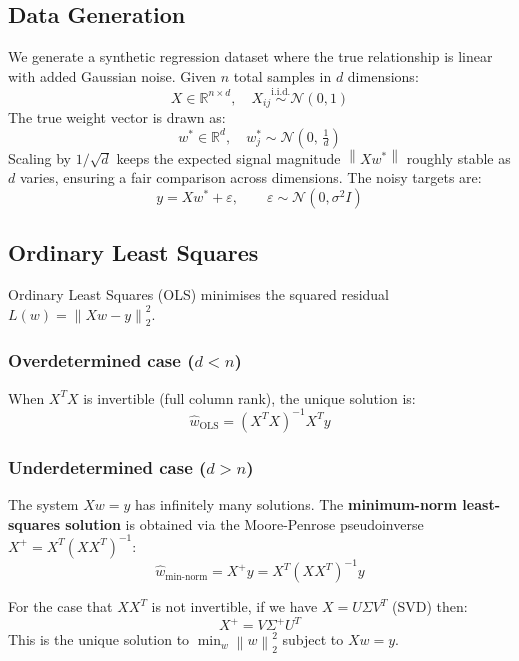 \documentclass[12pt, a4paper]{article}
\newcommand{\R}{\mathbb{R}}
\newcommand{\norm}[1]{\left\lVert #1 \right\rVert}
\begin{document}
\subsection{Data Generation}

We generate a synthetic regression dataset where the true relationship is linear with added Gaussian noise. Given $n$ total samples in $d$ dimensions:
\[
  X \in \R^{n \times d},\quad X_{ij} \overset{\text{i.i.d.}}{\sim} \mathcal{N}(0,1)
\]
The true weight vector is drawn as:
\[
  w^* \in \R^d,\quad w^*_j \sim \mathcal{N}\!\left(0,\,\tfrac{1}{d}\right)
\]
Scaling by $1/\sqrt{d}$ keeps the expected signal magnitude $\norm{Xw^*}$ roughly stable as $d$ varies, ensuring a fair comparison across dimensions. The noisy targets are:
\begin{equation}
  y = Xw^* + \varepsilon, \qquad \varepsilon \sim \mathcal{N}(0, \sigma^2 I)
  \label{eq:dgp}
\end{equation}

\subsection{Ordinary Least Squares}

Ordinary Least Squares (OLS) minimises the squared residual ${L}(w) = \norm{Xw - y}_2^2$.

\subsubsection*{Overdetermined case ($d < n$)}
When $X^TX$ is invertible (full column rank), the unique solution is:
\begin{equation}
  \hat{w}_{\mathrm{OLS}} = (X^TX)^{-1}X^Ty
  \label{eq:ols}
\end{equation}

\subsubsection*{Underdetermined case ($d > n$)}
The system $Xw = y$ has infinitely many solutions. The \textbf{minimum-norm least-squares solution} is obtained via the Moore-Penrose pseudoinverse $X^+ = X^T(XX^T)^{-1}$:
\begin{equation}
  \hat{w}_{\mathrm{min\text{-}norm}} = X^+y = X^T(XX^T)^{-1}y
  \label{eq:minnorm}
\end{equation}

For the case that $XX^T$ is not invertible, if we have $X = U\Sigma V^T$ (SVD) then:
\begin{equation}
  X^+ = V\Sigma^+U^T
  \label{eq:svd_pinv}
\end{equation}
This is the unique solution to $\min_w \norm{w}_2^2$ subject to $Xw = y$.
\end{document}
